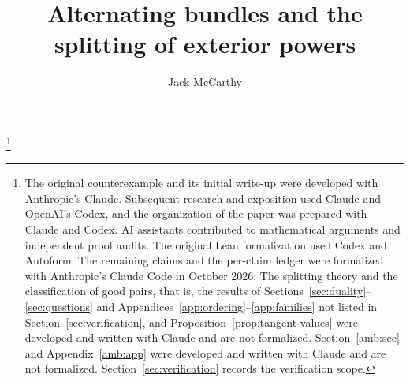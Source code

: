 \setlength{\emergencystretch}{1em}
\title{Alternating bundles and the splitting of exterior powers}
\author{Jack McCarthy}
\thanks{The original counterexample and its initial write-up were developed with Anthropic's
Claude. Subsequent research and exposition used Claude and OpenAI's Codex, and the organization of the paper was prepared
with Claude and Codex. AI assistants contributed to mathematical arguments and independent proof audits. The original Lean
formalization used Codex and Autoform. The remaining claims and the per-claim ledger were formalized with Anthropic's
Claude Code in October 2026. The splitting theory and the classification of good pairs, that is, the results of
Sections~\ref{sec:duality}--\ref{sec:questions} and Appendices~\ref{app:ordering}--\ref{app:families} not listed in
Section~\ref{sec:verification}, and Proposition~\ref{prop:tangent-values} were developed and written with Claude and are
not formalized. Section~\ref{amb:sec} and Appendix~\ref{amb:app} were developed and written with Claude and are not
formalized. Section~\ref{sec:verification} records the verification scope.}
\makeatletter
%
  {\PackageError{charp}{Unable to adjust title spacing}{Check the amsart title definition.}}
%
  {\PackageError{charp}{Unable to adjust abstract spacing}{Check the amsart title definition.}}
%
  {\PackageError{charp}{Unable to adjust author spacing}{Check the amsart author definition.}}
\g@addto@macro{}
\makeatother

